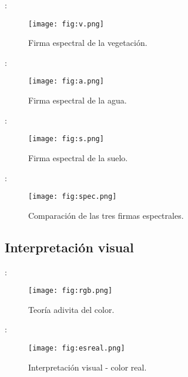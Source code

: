 \begin{frame}{\secname : \subsecname}
  \begin{figure}
    \centering
    \texttt{[image: fig:v.png]}
    \caption{Firma espectral de la vegetación.}
    \label{}
  \end{figure}
\end{frame}

\begin{frame}{\secname : \subsecname}
  \begin{figure}
    \centering
    \texttt{[image: fig:a.png]}
    \caption{Firma espectral de la agua.}
    \label{}
  \end{figure}
\end{frame}

\begin{frame}{\secname : \subsecname}
  \begin{figure}
    \centering
    \texttt{[image: fig:s.png]}
    \caption{Firma espectral de la suelo.}
    \label{}
  \end{figure}
\end{frame}

\begin{frame}{\secname : \subsecname}
  \begin{figure}
    \centering
    \texttt{[image: fig:spec.png]}
    \caption{Comparación de las tres firmas espectrales.}
    \label{}
  \end{figure}
\end{frame}

\subsection{Interpretación visual}

\begin{frame}{\secname : \subsecname}
  \begin{figure}
    \centering
    \texttt{[image: fig:rgb.png]}
    \caption{Teoría adivita del color.}
    \label{}
  \end{figure}
\end{frame}

\begin{frame}{\secname : \subsecname}
  \begin{figure}
    \centering
    \texttt{[image: fig:esreal.png]}
    \caption{Interpretación visual - color real. }
    \label{}
  \end{figure}
\end{frame}

